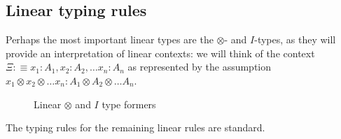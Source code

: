 \subsection{Linear typing rules}
Perhaps the most important linear types are the $\otimes$- and $I$-types, as they will provide an interpretation of linear contexts: we will think of the context $\Xi :\equiv x_1 : A_1, x_2 : A_2, \dots x_n : A_n$ as represented by the assumption $x_1 \otimes x_2 \otimes \dots x_n : A_1 \otimes A_2 \otimes \dots A_n$.
\begin{figure}[H]
\caption{Linear $\otimes$ and $I$ type formers}
\label{tensor}
\end{figure}
The typing rules for the remaining linear rules are standard.
